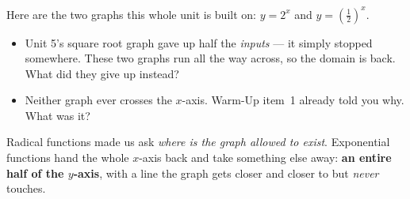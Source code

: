 \documentclass[10pt]{article}
\newcommand{\lgrid}[4]{%
  \draw[step=1, linegray!40, very thin] (#1,#3) grid (#2,#4);
  \draw[->, semithick, charcoal] (#1,0)--(#2,0) node[below right, font=\scriptsize]{$x$};
  \draw[->, semithick, charcoal] (0,#3)--(0,#4) node[left, font=\scriptsize]{$y$};}
\newcommand{\expcurve}[4]{\draw[very thick, forest, domain=#3:#4, samples=120, smooth]
  plot (\x,{#1*exp((#2)*(\x))});}
\begin{document}
\begin{hookbox}
Here are the two graphs this whole unit is built on: $y=2^{x}$ and $y=\left(\frac12\right)^{x}$.
\begin{center}
\end{center}
\begin{itemize}\setlength{\itemsep}{1pt}
  \item Unit 5's square root graph gave up half the \emph{inputs} --- it simply stopped somewhere. These two graphs run all the way across, so the domain is back. What did they give up instead? 
  \item Neither graph ever crosses the $x$-axis. Warm-Up item~1 already told you why. What was it? 
\end{itemize}
Radical functions made us ask \emph{where is the graph allowed to exist}. Exponential functions hand
the whole $x$-axis back and take something else away: \textbf{an entire half of the $y$-axis}, with a
line the graph gets closer and closer to but \emph{never} touches.
\end{hookbox}
\end{document}
